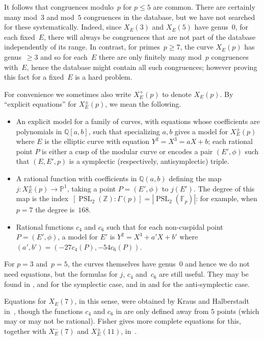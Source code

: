 \documentclass[12pt, reqno]{amsart}
\newcommand{\Fp}{\mathbb{F}_p}
\newcommand{\PP}{\mathbb{P}}
\newcommand{\Q}{\mathbb{Q}}
\newcommand{\Z}{\mathbb{Z}}
\newcommand{\PSL}{\operatorname{PSL}}
\numberwithin{equation}{section}
\theoremstyle{definition}
\theoremstyle{remark}
\begin{document}
It follows that congruences modulo~$p$ for $p\le 5$ are common.  There
are certainly many mod~$3$ and mod~$5$ congruences in the database,
but we have not searched for these systematically. Indeed, since
$X_E(3)$ and $X_E(5)$ have genus~0, for each fixed~$E$, there will
always be congruences that are not part of the database independently
of its range. In contrast, for primes~$p \geq 7$, the curve $X_E(p)$
has genus~$\geq 3$ and so for each~$E$ there are only finitely many
mod~$p$ congruences with~$E$, hence the database
might contain all such congruences; however proving this fact for a
fixed~$E$ is a hard problem.

For convenience 
we sometimes also write $X_E^+(p)$ to denote $X_E(p)$. 
By ``explicit equations'' for $X_E^{\pm}(p)$, we mean the
following.
\begin{itemize}
  \item An explicit model for a family of curves, with equations whose
    coefficients are polynomials in $\Q[a,b]$, such that specializing
    $a,b$ gives a model for $X_E^{\pm}(p)$ where $E$ is the elliptic
    curve with equation $Y^2=X^3=aX+b$; each rational point $P$ is
    either a cusp of the modular curve or encodes a pair $(E',\phi)$
    such that $(E,E', p)$ is a symplectic (respectively,
    antisymplectic) triple.
    \item A rational function with coefficients in $\Q(a,b)$ defining
      the map $j: X_E^{\pm}(p) \to \PP^1$, taking a point
      $P=(E',\phi)$ to $j(E')$.  The degree of this map is the
      index~$[\PSL_2(\Z):\Gamma(p)] = |\PSL_2(\Fp)|$: for example, when
        $p=7$ the degree is~$168$.
      \item Rational functions $c_4$ and $c_6$ such that for each
        non-cuspidal point~$P=(E',\phi)$, a model for $E'$ is
        $Y^2=X^3+a'X+b'$ where $(a',b')=(-27c_4(P),-54c_6(P))$.
\end{itemize}
For $p=3$ and~$p=5$, the curves themselves have genus~$0$ and hence we
do not need equations, but the formulas for $j$, $c_4$ and~$c_6$ are
still useful.  They may be found in \cite{Rubin-Silverberg},
\cite{Rubin-Silverberg2} and \cite{Silverberg} for the symplectic
case, and in \cite{FisherHessian} and \cite{FisherQuintic} for the
anti-symplectic case.

Equations for $X_E(7)$, in this sense, were obtained by Kraus and
Halberstadt in~\cite{Halberstadt-Kraus-XE7}, though the functions
$c_4$ and $c_6$ in \cite{Halberstadt-Kraus-XE7} are only defined away
from $5$ points (which may or may not be rational). Fisher gives more
complete equations for this, together with $X_E^-(7)$ and
$X_E^{\pm}(11)$, in~\cite{Fisher}.
\end{document}
